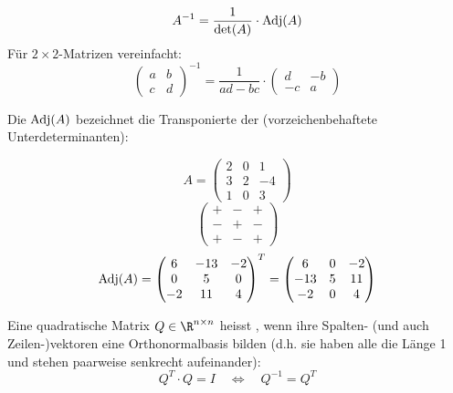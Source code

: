 \begin{defbox}
\[ A^{-1} = \frac{1}{\det(A)} \cdot \operatorname{Adj}(A) \]
Für $2 \times 2$-Matrizen vereinfacht:
\[
\begin{pmatrix}
  a & b \\
  c & d 
\end{pmatrix}^{-1}
=
\frac{1}{ad - bc} \cdot
\begin{pmatrix}
  d & -b \\
  -c & a 
\end{pmatrix}
\]
\end{defbox}


\begin{runintext}
Die  $\operatorname{Adj}(A)$ bezeichnet die Transponierte der  (vorzeichenbehaftete Unterdeterminanten):
\end{runintext}

\begin{formulabox}
  \[
  A = \begin{pmatrix} 2 & 0 & 1 \\ 3 & 2 & -4 \\ 1 & 0 & 3 \end{pmatrix}
  \]
  \[
  \begin{pmatrix}
    + & - & + \\
    - & + & - \\
    + & - & +
  \end{pmatrix}
  \]
  \ZSFsep
  \[
  \operatorname{Adj}(A) = 
  \begin{pmatrix} 
    6 & -13 & -2 \\
    0 & 5 & 0 \\
    -2 & 11 & 4 
  \end{pmatrix}^T = 
  \begin{pmatrix} 
    6 & 0 & -2 \\
    -13 & 5 & 11 \\
    -2 & 0 & 4 
  \end{pmatrix}
  \]
\end{formulabox}


\begin{defbox}
Eine quadratische Matrix $Q \in \R^{n \times n}$ heisst , wenn ihre Spalten- (und auch Zeilen-)vektoren eine Orthonormalbasis bilden  (d.h. sie haben alle die Länge 1 und stehen paarweise senkrecht aufeinander):
\[ Q^T \cdot Q = I \quad\Longleftrightarrow\quad Q^{-1} = Q^T \]
\end{defbox}

